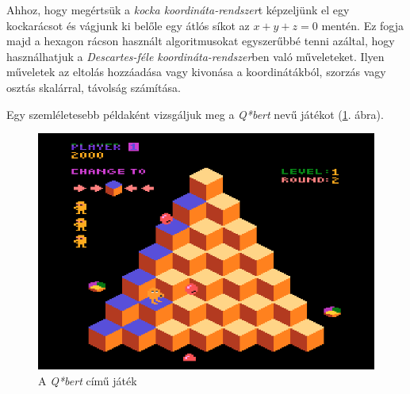 Ahhoz, hogy megértsük a \textit{kocka koordináta-rendszer}t képzeljünk el egy kockarácsot és vágjunk ki belőle egy átlós síkot az $x + y + z = 0$ mentén. Ez fogja majd a hexagon rácson használt algoritmusokat egyszerűbbé tenni azáltal, hogy használhatjuk a \textit{Descartes-féle koordináta-rendszer}ben való műveleteket. Ilyen műveletek az eltolás hozzáadása vagy kivonása a  koordinátákból, szorzás vagy osztás skalárral, távolság számítása.

Egy szemléletesebb példaként vizsgáljuk meg a \textit{Q*bert} nevű játékot (\ref{fig:Qbert}. ábra).

\begin{figure}[h!]
\centering
\includegraphics[scale=0.3]{kepek/Qbert.png}
\caption{A \textit{Q*bert} című játék}
\label{fig:Qbert}
\end{figure}

